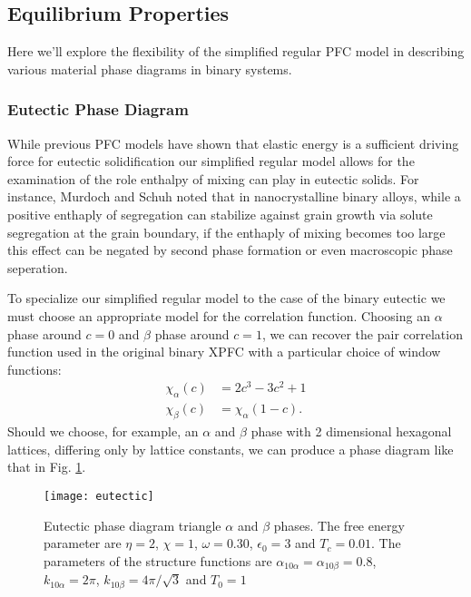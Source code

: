 \subsection{Equilibrium Properties} %

Here we'll explore the flexibility of the simplified regular PFC model in 
describing various material phase diagrams in binary systems.

\subsubsection{Eutectic Phase Diagram} %

While previous PFC models have shown that elastic energy is a sufficient
driving force for eutectic solidification our simplified regular model allows
for the examination of the role enthalpy of mixing can play in eutectic solids.
For instance, Murdoch and Schuh noted that in nanocrystalline binary alloys,
while a positive enthaply of segregation can stabilize against grain growth via
solute segregation at the grain boundary, if the enthaply of mixing becomes too
large this effect can be negated by second phase formation or even macroscopic
phase seperation\cite{MURDOCH13}. 

To specialize our simplified regular model to the case of the binary eutectic
we must choose an appropriate model for the correlation function. Choosing an
$\alpha$ phase around $c = 0$ and $\beta$ phase around $c = 1$, we can recover
the pair correlation function used in the original binary XPFC with a
particular choice of window functions: 
%
\begin{align}
   \chi_\alpha(c) &= 2c^3 - 3c^2 + 1 \\
   \chi_\beta(c) &= \chi_\alpha(1 - c).
\end{align}
%
Should we choose, for example, an $\alpha$ and $\beta$ phase with 2 dimensional
hexagonal lattices, differing only by lattice constants, we can produce a phase
diagram like that in Fig. \ref{eutectic}.  

\begin{figure}[h]
    \centering	
    \texttt{[image: eutectic]}
    \caption{
        \label{eutectic} Eutectic phase diagram triangle $\alpha$ and $\beta$
        phases. The free energy parameter are $\eta = 2$, $\chi = 1$,
        $\omega=0.30$, $\epsilon_0 = 3$ and $T_c = 0.01$. The parameters of the
        structure functions are $\alpha_{10\alpha} = \alpha_{10\beta} = 0.8$,
        $k_{10\alpha} = 2\pi$, $k_{10\beta} = 4\pi/\sqrt{3}$ and $T_0 = 1$
    }
\end{figure}

